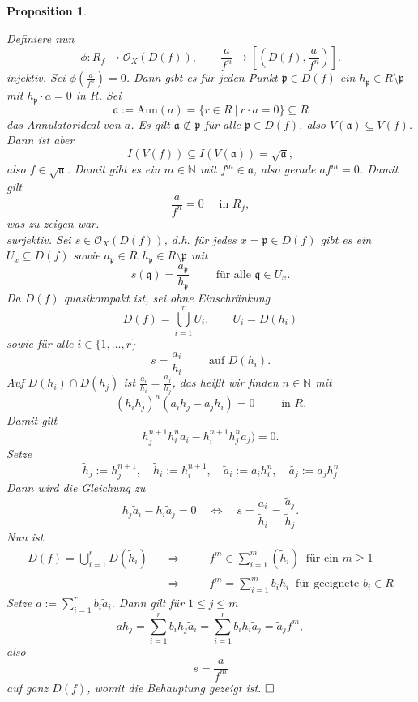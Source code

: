\documentclass[11pt]{book}
\newtheorem{proposition}[theorem]{Proposition}
\theoremstyle{nonumberbreak}
\newenvironment{pr}[1][]{\ifthenelse{\equal{#1}{}}{\proof}{\proof[#1]}\rm}{\endproof}
\newcommand{\p}{\mathfrak{p}}
\newcommand{\q}{\mathfrak{q}}
\newcommand{\ideal}{\subseteq}
\begin{document}
\begin{spacing}{1.4}
\begin{proposition}
\begin{pr}
\begin{compactenum}
\item Definiere nun 
$$\phi: R_f \longrightarrow \mathcal{O}_X\left( D(f)\right), \qquad \frac{a}{f^n} \mapsto \left[ \left(D(f), \frac{a}{f^n} \right) \right].$$
\textit{injektiv.} Sei $\phi\left( \frac{a}{f^n}\right) =0$. Dann gibt es für jeden Punkt $\p \in D(f)$ ein $h_{\p} \in R \setminus \p$ mit $h_{\p} \cdot a = 0$ in $R$. Sei 
$$\mathfrak{a}:= \textrm{Ann}(a) = \{ r \in R \ \vert \ r \cdot a = 0 \} \ideal R$$
das Annulatorideal von $a$. Es gilt $\mathfrak{a} \nsubset \p$ für alle $\p \in D(f)$, also $V(\mathfrak{a}) \subseteq V(f)$.  Dann ist aber 
$$I(V(f)) \subseteq I(V(\mathfrak{a})) = \sqrt{\mathfrak{a}},$$
also $f \in \sqrt{\mathfrak{a}}$. Damit gibt es ein $m \in \mathbb{N}$ mit $f^m \in \mathfrak{a}$, also gerade $a f^m =0$. Damit gilt $$\frac{a}{f^n} = 0 \quad \textrm{ in } R_f,$$
was zu zeigen war.\\
\textit{surjektiv.}
 Sei $s \in \mathcal{O}_X\left(D(f)\right)$, d.h. für jedes $x= \p \in D(f)$ gibt es ein $U_x \subseteq D(f)$ sowie $a_{\p} \in R, h_{\p} \in R \setminus \p$ mit
 $$s(\q) = \frac{a_{\p}}{h_{\p}} \qquad \textrm{ für alle } \q \in U_x.$$
Da $D(f)$ quasikompakt ist, sei ohne Einschränkung 
$$D(f) = \bigcup_{i=1}^r U_i, \qquad U_i = D(h_i)$$
sowie für alle $i \in \{1, \ldots, r\}$
$$s= \frac{a_i}{h_i} \qquad \textrm{ auf } D(h_i).$$
Auf $D(h_i) \cap D(h_j)$ ist $\frac{a_i}{h_i} = \frac{a_j}{h_j}$, das heißt wir finden $n \in \mathbb{N}$ mit
$$(h_i h_j)^n \left( a_ih_j - a_j h_i \right) = 0 \qquad \textrm{ in } R.$$
Damit gilt
$$h_j^{n+1} h_i^n a_i - h_i^{n+1}h_j^n a_j ) =0.$$
Setze
$$\tilde{h}_j := h_j^{n+1}, \quad \tilde{h}_i := h_i^{n+1}, \quad \tilde{a}_i := a_i h_i^n, \quad \tilde{a_j} := a_j h_j^n$$
Dann wird die Gleichung zu 
$$\tilde{h}_j \tilde{a}_i - \tilde{h}_i \tilde{a}_j = 0 \quad \Longleftrightarrow \quad s = \frac{\tilde{a}_i}{\tilde{h}_i} = \frac{\tilde{a}_j}{\tilde{h}_j}.$$
Nun ist
\setlength{\abovedisplayskip}{5.5pt}
\setlength{\belowdisplayskip}{5.5pt}
\begin{alignat*}{5}
D(f) = \bigcup_{i=1}^r D(\tilde{h}_i) \quad &\Longrightarrow && \quad f^m \in \sum_{i=1}^m ( \tilde{h}_i ) \ \textrm{ für ein } m \geqslant 1 \\
& \Longrightarrow && \quad f^m = \sum_{i=1}^m b_i \tilde{h}_i \ \textrm{ für geeignete } b_i \in R
\end{alignat*}
Setze $a:= \sum_{i=1}^r b_i \tilde{a}_i$. Dann gilt für $1 \leqslant j \leqslant m$
$$a \tilde{h}_j = \sum_{i=1}^r b_i \tilde{h}_j \tilde{a}_i = \sum_{i=1}^r b_i \tilde{h}_i \tilde{a}_j = \tilde{a}_j f^m,$$
also $$s= \frac{a}{f^m}$$
auf ganz $D(f)$, womit die Behauptung gezeigt ist. $\hfill \Box$
\end{compactenum}


\end{pr}
\end{proposition}
\end{spacing}
\end{document}
